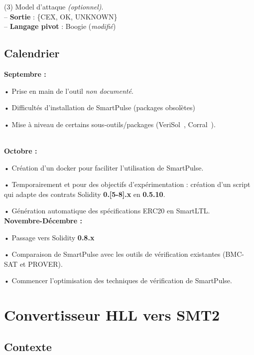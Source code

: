 \documentclass{article}
\begin{document}
\hspace{1.25cm} (3) Model d'attaque \textit{(optionnel)}. \\

\hspace{-0.5cm}-- \textbf{Sortie} : \{CEX, OK, UNKNOWN\} \\

\hspace{-0.5cm}-- \textbf{Langage pivot} : Boogie (\textit{modifié})

\subsection{Calendrier}
\textbf{Septembre : }

 • Prise en main de l'outil \textit{non documenté}.
 
 • Difficultés d'installation de SmartPulse (packages obsolètes)
 
 • Mise à niveau de certains sous-outils/packages (VeriSol~\cite{wang2019formal}, Corral~\cite{lal2012corral}).

\hspace{0.5cm}\\
\textbf{Octobre :}

 • Création d'un docker pour faciliter l'utilisation de SmartPulse.
 
 • Temporairement et pour des objectifs d'expérimentation : création d'un script qui adapte des contrats Solidity \textbf{0.[5-8].x} en \textbf{0.5.10}.
 
 • Génération automatique des spécifications ERC20 en SmartLTL.\\

\hspace{-0.5cm}\textbf{Novembre-Décembre :}

 • Passage vers Solidity \textbf{0.8.x}

 • Comparaison de SmartPulse avec les outils de vérification existantes (BMC-SAT et PROVER).
 
 • Commencer l'optimisation des techniques de vérification de SmartPulse.

\newpage

\section{Convertisseur HLL vers SMT2}
\subsection{Contexte}
\end{document}
